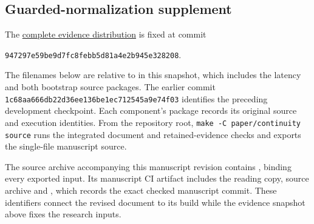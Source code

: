 \subsection{Guarded-normalization supplement}

The \href{https://github.com/billlza/q-periapt/tree/947297e59be9d7fc8febb5d81a4e2b945e328208/paper/continuity}{complete evidence distribution}
is fixed at commit
\begin{center}
\small\texttt{947297e59be9d7fc8febb5d81a4e2b945e328208}.
\end{center}
The filenames below are relative to  in this
snapshot, which includes the latency and both bootstrap source packages.
The earlier commit \texttt{1c68aa666db22d36ee136be1ec712545a9e74f03}
identifies the preceding development checkpoint. Each component's package
records its original source and execution identities.
From the repository root, \texttt{make -C paper/continuity source} runs
the integrated document and retained-evidence checks and exports the
single-file manuscript source.

The source archive accompanying this manuscript revision contains
, binding every exported input. Its manuscript CI
artifact includes the reading copy, source archive and
, which records the exact checked manuscript
commit. These identifiers connect the revised document to its build
while the evidence snapshot above fixes the research inputs.

